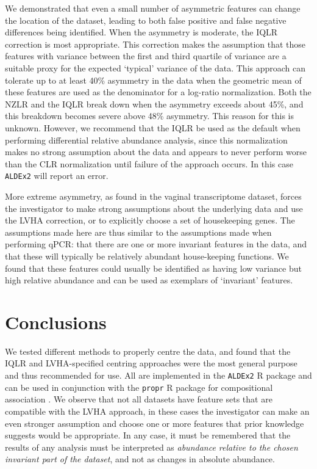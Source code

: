 \documentclass[graybox]{svmult}
\begin{document}
We demonstrated that even a small number of asymmetric features can change the location of the dataset, leading to both false positive and false negative differences being identified. When the asymmetry is moderate, the IQLR correction is most appropriate. This correction makes the assumption that those features with variance between the first and third quartile of variance are a suitable proxy for the expected `typical' variance of the data. This approach can tolerate up to at least 40\% asymmetry in the data when the geometric mean of these features are used as the denominator for a log-ratio normalization. Both the NZLR and the IQLR break down when the asymmetry exceeds about 45\%, and this breakdown becomes severe above 48\% asymmetry. This reason for this is unknown. However, we recommend that the IQLR be used as the default when performing differential relative abundance analysis, since this normalization makes no strong assumption about the data and appears to never perform worse than the CLR normalization until failure of the approach occurs. In this case \texttt{ALDEx2} will report an error.

More extreme asymmetry, as found in the vaginal transcriptome dataset, forces the investigator to make strong assumptions about the underlying data and use the LVHA correction, or to explicitly choose a set of housekeeping genes. The assumptions made here are thus similar to the assumptions made when performing qPCR: that there are one or more invariant features in the data, and that these will typically be relatively abundant house-keeping functions. We found that these features could usually be identified as having low variance but high relative abundance and can be used as exemplars of `invariant' features. 

\section*{Conclusions}
We tested  different methods to properly centre the data, and found that the IQLR and LVHA-specified centring approaches were the most general purpose and thus recommended for use. All are implemented in the \texttt{ALDEx2} R package \cite{fernandes:2014} and can be used in conjunction with the \texttt{propr} R package for compositional association \cite{Quinn:2017}. We observe that not all datasets have feature sets that are compatible with the LVHA approach, in these cases the investigator can make an even stronger assumption and choose one or more features that prior knowledge suggests would be appropriate.  In any case, it must be remembered that the results of any analysis must be interpreted as \textit{abundance relative to the chosen invariant part of the dataset}, and not as changes in absolute abundance.
\end{document}
